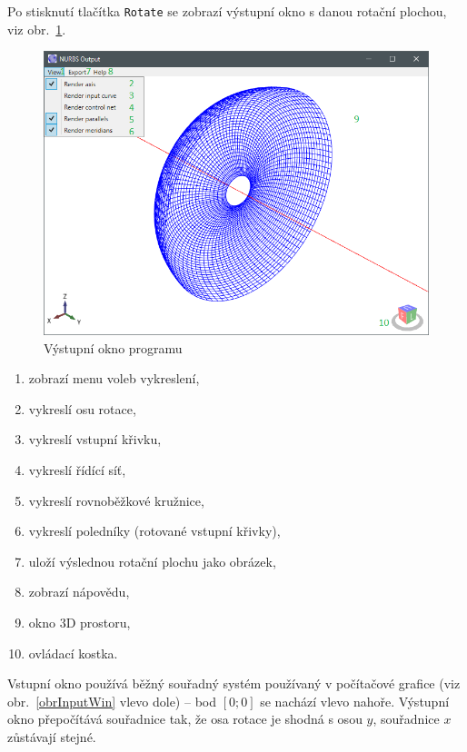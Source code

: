 \pagebreak
Po stisknutí tlačítka \texttt{Rotate} se zobrazí výstupní okno s danou rotační plochou, viz obr.~\ref{obrOutputWin}.
\begin{figure}[!h]
	\begin{center}
		\includegraphics*[width=\textwidth]{obr/OutputWin}
	\end{center}
	\caption{Výstupní okno programu}
	\label{obrOutputWin}
\end{figure}
\begin{multicols}{2}
	\begin{enumerate}
		\item zobrazí menu voleb vykreslení,
		\item vykreslí osu rotace,
		\item vykreslí vstupní křivku,
		\item vykreslí řídící síť,
		\item vykreslí rovnoběžkové kružnice,
		\item vykreslí poledníky (rotované vstupní křivky),
		\item uloží výslednou rotační plochu jako obrázek,
		\item zobrazí nápovědu,
		\item okno 3D prostoru,
		\item ovládací kostka.
	\end{enumerate}
\end{multicols}
\begin{poznamka}
	Vstupní okno používá běžný souřadný systém používaný v počítačové grafice (viz obr.~\ref{obrInputWin} vlevo dole) -- bod $\left[0;0\right]$ se nachází vlevo nahoře. Výstupní okno přepočítává souřadnice tak, že osa rotace je shodná s osou $y$, souřadnice $x$ zůstávají stejné.
\end{poznamka}

